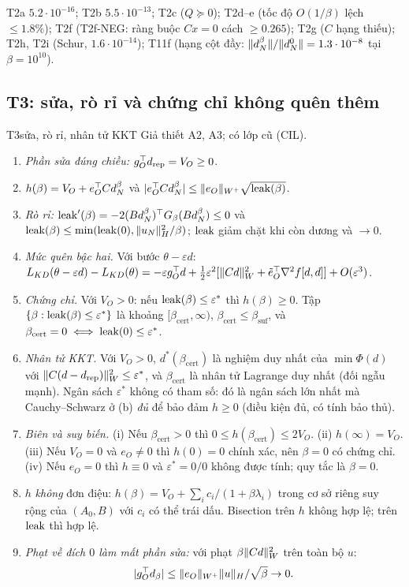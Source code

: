 \begin{kiem}
T2a $5.2\cdot10^{-16}$; T2b $5.5\cdot10^{-13}$; T2c ($Q\succeq0$); T2d--e (tốc độ $O(1/\beta)$ lệch $\le1.8\%$); T2f (T2f-NEG: ràng buộc $Cx=0$ cách $\ge0.265$); T2g ($C$ hạng thiếu); T2h, T2i (Schur, $1.6\cdot10^{-14}$); T11f (hạng cột đầy: $\lVert d_N^{\beta}\rVert/\lVert d_N^0\rVert=1.3\cdot10^{-8}$ tại $\beta=10^{10}$).
\end{kiem}

\subsection{T3: sửa, rò rỉ và chứng chỉ không quên thêm}

\begin{namedthm}{T3}{sửa, rò rỉ, nhân tử KKT}
Giả thiết A2, A3; có lớp cũ (CIL).
\begin{enumerate}[label=(\alph*)]
\item \emph{Phần sửa đúng chiều:} $g_O^{\top}d_{\mathrm{rep}}=V_O\ge0$.
\item $h(\beta)=V_O+e_O^{\top} Cd_N^{\beta}$ và $|e_O^{\top} Cd_N^{\beta}|\le\lVert e_O\rVert_{W^+}\sqrt{\operatorname{leak}(\beta)}$.
\item \emph{Rò rỉ:} $\operatorname{leak}'(\beta)=-2(Bd_N^{\beta})^{\top} G_\beta(Bd_N^{\beta})\le0$ và $\operatorname{leak}(\beta)\le\min(\operatorname{leak}(0),\lVert u_N\rVert_H^2/\beta)$; $\operatorname{leak}$ giảm chặt khi còn dương và $\to0$.
\item \emph{Mức quên bậc hai.} Với bước $\theta-\varepsilon d$: $L_{KD}(\theta-\varepsilon d)-L_{KD}(\theta)=-\varepsilon g_O^{\top} d+\tfrac12\varepsilon^2[\lVert Cd\rVert_W^2+\tilde e_O^{\top}\nabla^2f[d,d]]+O(\varepsilon^3)$.
\item \emph{Chứng chỉ.} Với $V_O>0$: nếu $\operatorname{leak}(\beta)\le\varepsilon^*$ thì $h(\beta)\ge0$. Tập $\{\beta:\operatorname{leak}(\beta)\le\varepsilon^*\}$ là khoảng $[\beta_{\mathrm{cert}},\infty)$, $\beta_{\mathrm{cert}}\le\beta_{\mathrm{suf}}$, và $\beta_{\mathrm{cert}}=0\iff\operatorname{leak}(0)\le\varepsilon^*$.
\item \emph{Nhân tử KKT.} Với $V_O>0$, $d^*(\beta_{\mathrm{cert}})$ là nghiệm duy nhất của $\min\Phi(d)$ với $\lVert C(d-d_{\mathrm{rep}})\rVert_W^2\le\varepsilon^*$, và $\beta_{\mathrm{cert}}$ là nhân tử Lagrange duy nhất (đối ngẫu mạnh). Ngân sách $\varepsilon^*$ không có tham số: đó là ngân sách lớn nhất mà Cauchy--Schwarz ở (b) \emph{đủ} để bảo đảm $h\ge0$ (điều kiện đủ, có tính bảo thủ).
\item \emph{Biên và suy biến.} (i) Nếu $\beta_{\mathrm{cert}}>0$ thì $0\le h(\beta_{\mathrm{cert}})\le2V_O$. (ii) $h(\infty)=V_O$. (iii) Nếu $V_O=0$ và $e_O\ne0$ thì $h(0)=0$ chính xác, nên $\beta=0$ có chứng chỉ. (iv) Nếu $e_O=0$ thì $h\equiv0$ và $\varepsilon^*=0/0$ không được tính; quy tắc là $\beta=0$.
\item $h$ \emph{không} đơn điệu: $h(\beta)=V_O+\sum_ic_i/(1+\beta\lambda_i)$ trong cơ sở riêng suy rộng của $(A_0,B)$ với $c_i$ có thể trái dấu. Bisection trên $h$ không hợp lệ; trên $\operatorname{leak}$ thì hợp lệ.
\item \emph{Phạt về đích $0$ làm mất phần sửa:} với phạt $\beta\lVert Cd\rVert_W^2$ trên toàn bộ $u$:
\[|g_O^{\top} d_\beta|\le\lVert e_O\rVert_{W^+}\lVert u\rVert_H/\sqrt\beta\to0.\]
\end{enumerate}
\end{namedthm}

